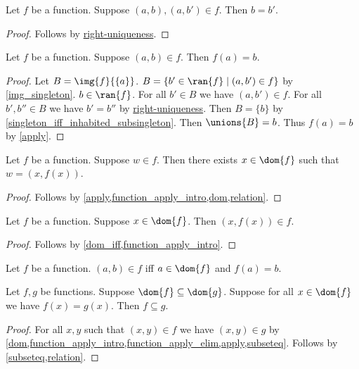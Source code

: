 \begin{proposition}\label{function_rightunique}
    Let $f$ be a function.
    Suppose $(a,b), (a, b')\in f$.
    Then $b = b'$.
\end{proposition}
\begin{proof}
    Follows by \hyperref[rightunique]{right-uniqueness}.
\end{proof}

\begin{proposition}\label{function_apply_intro}
    Let $f$ be a function.
    Suppose $(a,b)\in f$.
    Then $f(a) = b$.
\end{proposition}
\begin{proof}
    Let $B = \img{f}{\{a\}}$.
    $B = \{b'\in\ran{f}\mid (a,b')\in f \}$ by \cref{img_singleton}.
    $b\in\ran{f}$.
    For all $b'\in  B$ we have $(a, b')\in f$.
    For all $b', b''\in  B$ we have $b' = b''$ by \hyperref[rightunique]{right-uniqueness}.
    Then $B = \{b\}$ by \cref{singleton_iff_inhabited_subsingleton}.
    Then $\unions{B} = b$.
    Thus $f(a) = b$ by \cref{apply}.
\end{proof}

\begin{proposition}\label{function_member_elim}
    Let $f$ be a function.
    Suppose $w\in f$.
    Then there exists $x\in\dom{f}$ such that $w = (x, f(x))$.
\end{proposition}
\begin{proof}
    Follows by \cref{apply,function_apply_intro,dom,relation}.
\end{proof}

\begin{proposition}\label{function_apply_elim}
    Let $f$ be a function.
    Suppose $x\in\dom{f}$.
    Then $(x,f(x))\in f$.
\end{proposition}
\begin{proof}
    Follows by \cref{dom_iff,function_apply_intro}.
\end{proof}

\begin{proposition}\label{function_apply_iff}
    Let $f$ be a function.
    $(a,b)\in f$ iff $a\in\dom{f}$ and $f(a) = b$.
\end{proposition}

\begin{proposition}\label{fun_subseteq}
    Let $f, g$ be functions.
    Suppose $\dom{f}\subseteq \dom{g}$.
    Suppose for all $x\in\dom{f}$ we have $f(x) = g(x)$.
    Then $f\subseteq g$.
\end{proposition}
\begin{proof}
    For all $x,y$ such that $(x,y)\in f$ we have $(x,y)\in g$ by \cref{dom,function_apply_intro,function_apply_elim,apply,subseteq}.
    Follows by \cref{subseteq,relation}.
\end{proof}

